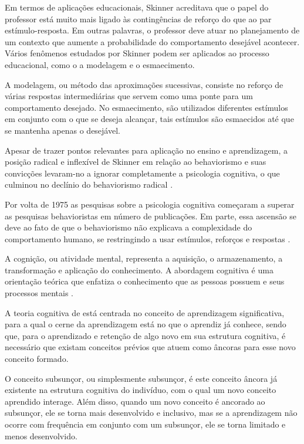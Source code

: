 Em termos de aplicações educacionais, Skinner acreditava que o papel do professor está muito mais ligado às contingências de reforço do que ao par estímulo-resposta. Em outras palavras, o professor deve atuar no planejamento de um contexto que aumente a probabilidade do comportamento desejável acontecer. Vários fenômenos estudados por Skinner podem ser aplicados ao processo educacional, como o a modelagem e o esmaecimento.

A modelagem, ou método das aproximações sucessivas, consiste no reforço de várias respostas intermediárias que servem como uma ponte para um comportamento desejado. No esmaecimento, são utilizados diferentes estímulos em conjunto com o que se deseja alcançar, tais estímulos são esmaecidos até que se mantenha apenas o desejável.

Apesar de trazer pontos relevantes para aplicação no ensino e aprendizagem, a posição radical e inflexível de Skinner em relação ao behaviorismo e suas convicções levaram-no a ignorar completamente a psicologia cognitiva, o que culminou no declínio do behaviorismo radical \cite{fragelli2010, silva2005, moreira1999}.

Por volta de 1975 as pesquisas sobre a psicologia cognitiva começaram a superar as pesquisas behavioristas em número de publicações. Em parte, essa ascensão se deve ao fato de que o behaviorismo não explicava a complexidade do comportamento humano, se restringindo a usar estímulos, reforços e respostas \cite{robins1999}.

A cognição, ou atividade mental, representa a aquisição, o armazenamento, a transformação e aplicação do conhecimento. A abordagem cognitiva é uma orientação teórica que enfatiza o conhecimento que as pessoas possuem e seus processos mentais \cite{matlin2004}.

A teoria cognitiva de \cite{ausubel2000} está centrada no conceito de aprendizagem significativa, para a qual o cerne da aprendizagem está no que o aprendiz já conhece, sendo que, para o aprendizado e retenção de algo novo em sua estrutura cognitiva, é necessário que existam conceitos prévios que atuem como âncoras para esse novo conceito formado.

O conceito subsunçor, ou simplesmente subsunçor, é este conceito âncora já existente na estrutura cognitiva do indivíduo, com o qual um novo conceito aprendido interage. Além disso, quando um novo conceito é ancorado ao subsunçor, ele se torna mais desenvolvido e inclusivo, mas se a aprendizagem não ocorre com frequência em conjunto com um subsunçor, ele se torna limitado e menos desenvolvido.

